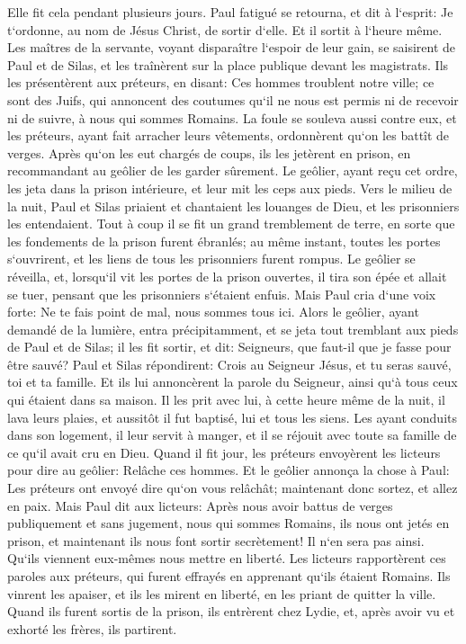 \verse Elle fit cela pendant plusieurs jours. Paul fatigué se retourna, et dit à l`esprit: Je t`ordonne, au nom de Jésus Christ, de sortir d`elle. Et il sortit à l`heure même. 
\verse Les maîtres de la servante, voyant disparaître l`espoir de leur gain, se saisirent de Paul et de Silas, et les traînèrent sur la place publique devant les magistrats. 
\verse Ils les présentèrent aux préteurs, en disant: Ces hommes troublent notre ville; 
\verse ce sont des Juifs, qui annoncent des coutumes qu`il ne nous est permis ni de recevoir ni de suivre, à nous qui sommes Romains. 
\verse La foule se souleva aussi contre eux, et les préteurs, ayant fait arracher leurs vêtements, ordonnèrent qu`on les battît de verges. 
\verse Après qu`on les eut chargés de coups, ils les jetèrent en prison, en recommandant au geôlier de les garder sûrement. 
\verse Le geôlier, ayant reçu cet ordre, les jeta dans la prison intérieure, et leur mit les ceps aux pieds. 
\verse Vers le milieu de la nuit, Paul et Silas priaient et chantaient les louanges de Dieu, et les prisonniers les entendaient. 
\verse Tout à coup il se fit un grand tremblement de terre, en sorte que les fondements de la prison furent ébranlés; au même instant, toutes les portes s`ouvrirent, et les liens de tous les prisonniers furent rompus. 
\verse Le geôlier se réveilla, et, lorsqu`il vit les portes de la prison ouvertes, il tira son épée et allait se tuer, pensant que les prisonniers s`étaient enfuis. 
\verse Mais Paul cria d`une voix forte: Ne te fais point de mal, nous sommes tous ici. 
\verse Alors le geôlier, ayant demandé de la lumière, entra précipitamment, et se jeta tout tremblant aux pieds de Paul et de Silas; 
\verse il les fit sortir, et dit: Seigneurs, que faut-il que je fasse pour être sauvé? 
\verse Paul et Silas répondirent: Crois au Seigneur Jésus, et tu seras sauvé, toi et ta famille. 
\verse Et ils lui annoncèrent la parole du Seigneur, ainsi qu`à tous ceux qui étaient dans sa maison. 
\verse Il les prit avec lui, à cette heure même de la nuit, il lava leurs plaies, et aussitôt il fut baptisé, lui et tous les siens. 
\verse Les ayant conduits dans son logement, il leur servit à manger, et il se réjouit avec toute sa famille de ce qu`il avait cru en Dieu. 
\verse Quand il fit jour, les préteurs envoyèrent les licteurs pour dire au geôlier: Relâche ces hommes. 
\verse Et le geôlier annonça la chose à Paul: Les préteurs ont envoyé dire qu`on vous relâchât; maintenant donc sortez, et allez en paix. 
\verse Mais Paul dit aux licteurs: Après nous avoir battus de verges publiquement et sans jugement, nous qui sommes Romains, ils nous ont jetés en prison, et maintenant ils nous font sortir secrètement! Il n`en sera pas ainsi. Qu`ils viennent eux-mêmes nous mettre en liberté. 
\verse Les licteurs rapportèrent ces paroles aux préteurs, qui furent effrayés en apprenant qu`ils étaient Romains. 
\verse Ils vinrent les apaiser, et ils les mirent en liberté, en les priant de quitter la ville. 
\verse Quand ils furent sortis de la prison, ils entrèrent chez Lydie, et, après avoir vu et exhorté les frères, ils partirent. 

